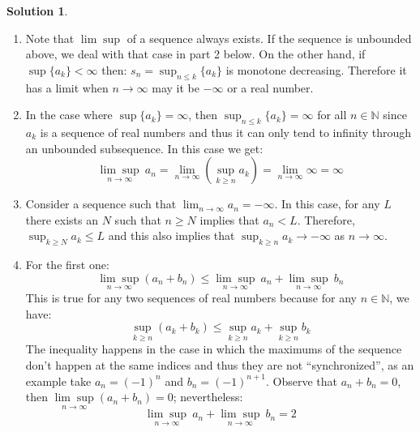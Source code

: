 \documentclass{article}
\theoremstyle{definition}
\newtheorem*{soln}{Solution}
\theoremstyle{theorem}
\newcommand{\N}{\mathbb{N}}
\begin{document}
\begin{soln}
    \begin{enumerate}
        \item Note that $\lim \sup$ of a sequence always exists. If the sequence is unbounded above, we deal with that case in part 2 below. On the other hand, if $\sup\{a_k\}<\infty$ then: $s_n=\sup_{n\leq k}\{a_k\}$ is monotone decreasing. Therefore it  has a limit when $n\to \infty$ may it be $-\infty$ or a real number.
        \item In the case where $\sup\{a_k\}=\infty$, then $\sup_{n\leq k}\{a_k\}= \infty$ for all $n\in \N$ since $a_k$ is a sequence of real numbers and thus it can only tend to infinity through an unbounded subsequence. In this case we get:
            $$\underset{n \to \infty}{\lim \sup}\ a_n = \lim_{n \to \infty} \left( \sup_{k \geq n} a_k \right)= \lim_{n\to \infty} \infty = \infty$$
        \item Consider a sequence such that $\lim_{n \to \infty} a_n = -\infty$. In this case, for any $L$ there exists an $N$ such that $n\geq N$ implies that $a_n<L$. Therefore, $\sup_{k\geq N}a_k\leq L$ and this also implies that $\sup_{k\geq n}a_k \to -\infty$ as $n\to \infty$.
        \item For the first one:
        $$\underset{n \to \infty}{\lim \sup} (a_n + b_n)  \leq \underset{n \to \infty}{\lim \sup}\  a_n + \underset{n \to \infty}{\lim \sup}\ b_n$$
            This is true for any two sequences of real numbers because for any $n\in \N$, we have:
            $$\sup_{k\geq n} (a_k+b_k) \leq \sup_{k\geq n} a_k+ \sup_{k\geq n} b_k$$
            The inequality happens in the case in which the maximums of the sequence don't happen at the same indices and thus they are not ``synchronized'', as an example take $a_n=(-1)^n$ and $b_n=(-1)^{n+1}$.  Observe that $a_n+b_n=0$, then $\underset{n \to \infty}{\lim \sup} (a_n + b_n) = 0$; nevertheless:    $$\underset{n \to \infty}{\lim \sup}\  a_n + \underset{n \to \infty}{\lim \sup}\ b_n = 2$$


\end{enumerate}
\end{soln}
\end{document}
